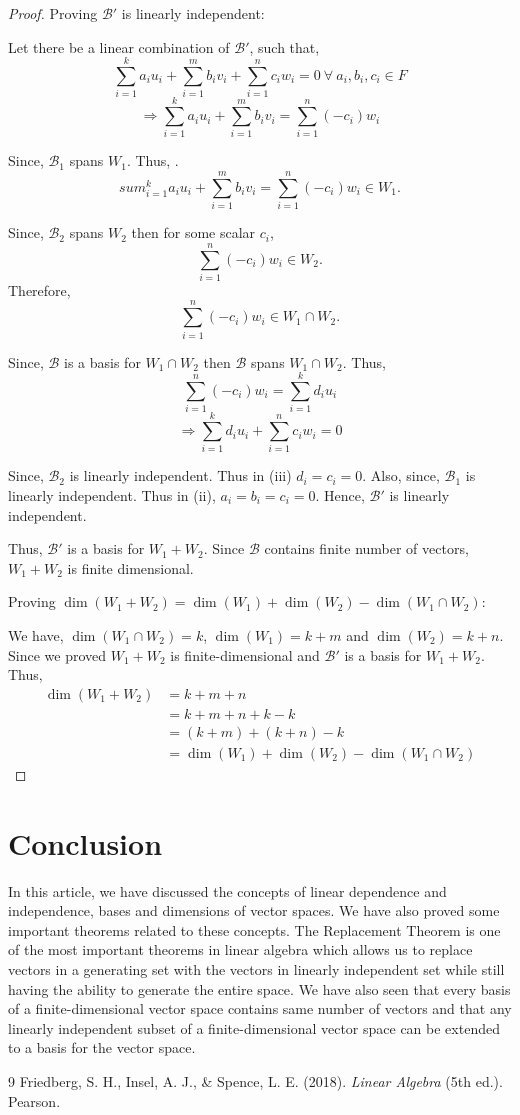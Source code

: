 \documentclass[12pt, a4paper]{article}
\theoremstyle{definition}
\theoremstyle{remark}
\newcommand{\B}{\mathscr{B}}
\begin{document}
\begin{proof}
\vspace{3mm}
\noindent Proving $\B'$ is linearly independent:

\noindent Let there be a linear combination of $\B'$, such that,
\[\sum_{i=1}^{k} a_i u_i + \sum_{i=1}^{m} b_i v_i + \sum_{i=1}^{n} c_i w_i = 0 \ \forall \ a_i, b_i, c_i \in F \tag{ii}\]
$$\Rightarrow \sum_{i=1}^{k} a_i u_i + \sum_{i=1}^{m} b_i v_i = \sum_{i=1}^{n} (-c_i) w_i$$

\noindent Since, $\B_1$ spans $W_1$. Thus, .$$sum_{i=1}^{k} a_i u_i + \sum_{i=1}^{m} b_i v_i = \sum_{i=1}^{n} (-c_i) w_i \in W_1.$$

\noindent Since, $\B_2$ spans $W_2$ then for some scalar $c_i$, $$\sum_{i=1}^{n} (-c_i) w_i \in W_2.$$ Therefore, $$\sum_{i=1}^{n} (-c_i) w_i \in W_1 \cap W_2.$$

\noindent Since, $\B$ is a basis for $W_1 \cap W_2$ then $\B$ spans $W_1 \cap W_2$. Thus,
$$\sum_{i=1}^{n} (-c_i) w_i = \sum_{i=1}^{k} d_i u_i$$
\[\Rightarrow \sum_{i=1}^{k} d_i u_i + \sum_{i=1}^{n} c_i w_i = 0 \tag{iii}\]

\noindent Since, $\B_2$ is linearly independent. Thus in (iii) $d_i = c_i = 0$. Also, since, $\B_1$ is linearly independent. Thus in (ii), $a_i = b_i = c_i = 0$. Hence, $\B'$ is linearly independent.

Thus, $\B'$ is a basis for $W_1 + W_2$. Since $\B$ contains finite number of vectors, $W_1 + W_2$ is finite dimensional.

\vspace{3mm}
\noindent Proving $\dim(W_1 + W_2) = \dim(W_1) + \dim(W_2) - \dim(W_1 \cap W_2)$:

\noindent We have, $\dim(W_1 \cap W_2) = k$, $\dim(W_1) = k + m$ and $\dim(W_2) = k + n$. Since we proved $W_1 + W_2$ is finite-dimensional and $\B'$ is a basis for $W_1 + W_2$. Thus,
\begin{align*}
\dim(W_1 + W_2) &= k + m + n \\
&= k + m + n + k - k \\
&= (k + m) + (k + n) - k \\
&= \dim(W_1) + \dim(W_2) - \dim(W_1 \cap W_2)
\end{align*}
\end{proof}

\section{Conclusion}
    In this article, we have discussed the concepts of linear dependence and independence, bases and dimensions of vector spaces. We have also proved some important theorems related to these concepts. The Replacement Theorem is one of the most important theorems in linear algebra which allows us to replace vectors in a generating set with the vectors in linearly independent set while still having the ability to generate the entire space. We have also seen that every basis of a finite-dimensional vector space contains same number of vectors and that any linearly independent subset of a finite-dimensional vector space can be extended to a basis for the vector space.

\begin{thebibliography}{9}
    Friedberg, S. H., Insel, A. J., \& Spence, L. E. (2018). \textit{Linear Algebra} (5th ed.). Pearson.
\end{thebibliography}
\end{document}
